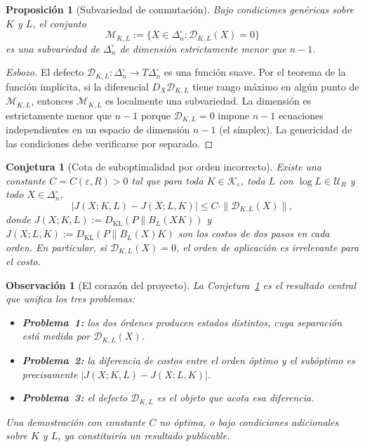 \documentclass[12pt]{article}
\newtheorem{proposicion}{Proposición}[section]
\newtheorem{observacion}{Observación}[section]
\newtheorem{conjetura}{Conjetura}[section]
\begin{document}
\begin{proposicion}[Subvariedad de conmutación]
\label{prop:subvariedad}
Bajo condiciones genéricas sobre $K$ y $L$, el conjunto
\[
\mathcal{M}_{K,L}
:=
\bigl\{X\in\Delta_n^\circ:\mathcal{D}_{K,L}(X)=0\bigr\}
\]
es una subvariedad de $\Delta_n^\circ$ de dimensión estrictamente menor que
$n-1$.
\end{proposicion}

\begin{proof}[Esbozo]
El defecto $\mathcal{D}_{K,L}:\Delta_n^\circ\to T\Delta_n^\circ$ es una función
suave. Por el teorema de la función implícita, si la diferencial
$D_X\mathcal{D}_{K,L}$ tiene rango máximo en algún punto de
$\mathcal{M}_{K,L}$, entonces $\mathcal{M}_{K,L}$ es localmente una subvariedad.
La dimensión es estrictamente menor que $n-1$ porque $\mathcal{D}_{K,L}=0$ impone
$n-1$ ecuaciones independientes en un espacio de dimensión $n-1$ (el símplex).
La genericidad de las condiciones debe verificarse por separado.
\end{proof}

\begin{conjetura}[Cota de suboptimalidad por orden incorrecto]
\label{conj:cota}
Existe una constante $C=C(\varepsilon,R)>0$ tal que para toda $K\in
\mathcal{K}_\varepsilon$, toda $L$ con $\log L\in\mathcal{U}_R$ y todo
$X\in\Delta_n^\circ$,
\[
\bigl|J(X;K,L)-J(X;L,K)\bigr|
\leq
C\cdot\|\mathcal{D}_{K,L}(X)\|,
\]
donde $J(X;K,L):=D_{\mathrm{KL}}(P\|B_L(XK))$ y
$J(X;L,K):=D_{\mathrm{KL}}(P\|B_L(X)K)$ son los costos de dos pasos en cada
orden.
En particular, si $\mathcal{D}_{K,L}(X)=0$, el orden de aplicación es
irrelevante para el costo.
\end{conjetura}

\begin{observacion}[El corazón del proyecto]
La Conjetura~\ref{conj:cota} es el resultado central que unifica los tres
problemas:
\begin{itemize}[nosep]
  \item \textbf{Problema~1:} los dos órdenes producen estados distintos,
        cuya separación está medida por $\mathcal{D}_{K,L}(X)$.
  \item \textbf{Problema~2:} la diferencia de costos entre el orden óptimo y
        el subóptimo es precisamente $|J(X;K,L)-J(X;L,K)|$.
  \item \textbf{Problema~3:} el defecto $\mathcal{D}_{K,L}$ es el objeto que
        acota esa diferencia.
\end{itemize}
Una demostración con constante $C$ no óptima, o bajo condiciones adicionales
sobre $K$ y $L$, ya constituiría un resultado publicable.
\end{observacion}
\end{document}
